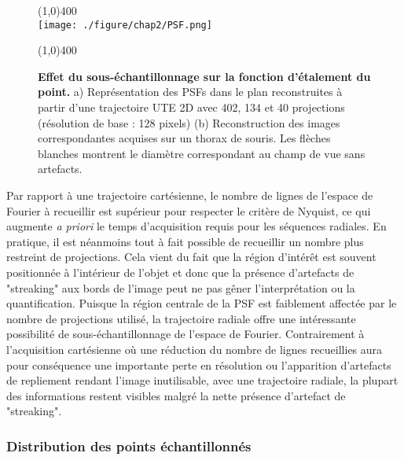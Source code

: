 \begin{figure}[h]
\centering
\line(1,0){400} \\
\texttt{[image: ./figure/chap2/PSF.png]}
\caption[Effet du sous-échantillonnage sur la fonction d'étalement du point.]{\label{fig:PSF} \textbf{Effet du sous-échantillonnage sur la fonction d'étalement du point.} a) Représentation des PSFs dans le plan reconstruites à partir d'une trajectoire UTE 2D avec 402, 134 et 40 projections (résolution de base : 128 pixels) (b) Reconstruction des images correspondantes acquises sur un thorax de souris. Les flèches blanches montrent le diamètre correspondant au champ de vue sans artefacts.}
\line(1,0){400} \\
\end{figure}

Par rapport à une trajectoire cartésienne, le nombre de lignes de l'espace de Fourier à recueillir est supérieur pour respecter le critère de Nyquist, ce qui augmente \textit{a priori} le temps d'acquisition requis pour les séquences radiales. En pratique, il est néanmoins tout à fait possible de recueillir un nombre plus restreint de projections. Cela vient du fait que la région d'intérêt est souvent positionnée à l'intérieur de l'objet et donc que la présence d'artefacts de "streaking" aux bords de l'image peut ne pas gêner l'interprétation ou la quantification. Puisque la région centrale de la PSF est faiblement affectée par le nombre de projections utilisé, la trajectoire radiale offre une intéressante possibilité de sous-échantillonnage de l'espace de Fourier. Contrairement à l'acquisition cartésienne où une réduction du nombre de lignes recueillies aura pour conséquence une importante perte en résolution ou l'apparition d'artefacts de repliement rendant l'image inutilisable, avec une trajectoire radiale, la plupart des informations restent visibles malgré la nette présence d'artefact de "streaking".

\subsubsection{Distribution des points échantillonnés}

